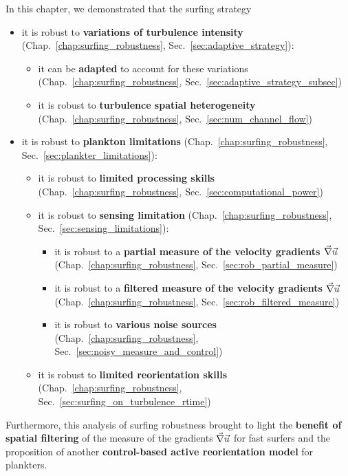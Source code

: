 In this chapter, we demonstrated that the surfing strategy
\begin{itemize}
	\item it is robust to \textbf{variations of turbulence intensity} (Chap.~\ref{chap:surfing_robustness}, Sec.~\ref{sec:adaptive_strategy}):
		\begin{itemize}
			\item it can be \textbf{adapted} to account for these variations (Chap.~\ref{chap:surfing_robustness}, Sec.~\ref{sec:adaptive_strategy_subsec})
			\item it is robust to \textbf{turbulence spatial heterogeneity} (Chap.~\ref{chap:surfing_robustness}, Sec.~\ref{sec:num_channel_flow})
		\end{itemize}
	\item it is robust to \textbf{plankton limitations} (Chap.~\ref{chap:surfing_robustness}, Sec.~\ref{sec:plankter_limitations}):
		\begin{itemize}
			\item it is robust to \textbf{limited processing skills} (Chap.~\ref{chap:surfing_robustness}, Sec.~\ref{sec:computational_power})
			\item it is robust to \textbf{sensing limitation} (Chap.~\ref{chap:surfing_robustness}, Sec.~\ref{sec:sensing_limitations}):
				\begin{itemize}
					\item it is robust to a \textbf{partial measure of the velocity gradients $\vec{\nabla} \vec{u}$} (Chap.~\ref{chap:surfing_robustness}, Sec.~\ref{sec:rob_partial_measure})
					\item it is robust to a \textbf{filtered measure of the velocity gradients $\vec{\nabla} \vec{u}$} (Chap.~\ref{chap:surfing_robustness}, Sec.~\ref{sec:rob_filtered_measure})
					\item it is robust to \textbf{various noise sources} (Chap.~\ref{chap:surfing_robustness}, Sec.~\ref{sec:noisy_measure_and_control})
				\end{itemize}
			\item it is robust to \textbf{limited reorientation skills} (Chap.~\ref{chap:surfing_robustness}, Sec.~\ref{sec:surfing_on_turbulence_rtime})
		\end{itemize}
\end{itemize}
Furthermore, this analysis of surfing robustness brought to light the \textbf{benefit of spatial filtering} of the measure of the gradients $\vec{\nabla} \vec{u}$ for fast surfers and the proposition of another \textbf{control-based active reorientation model} for plankters.
